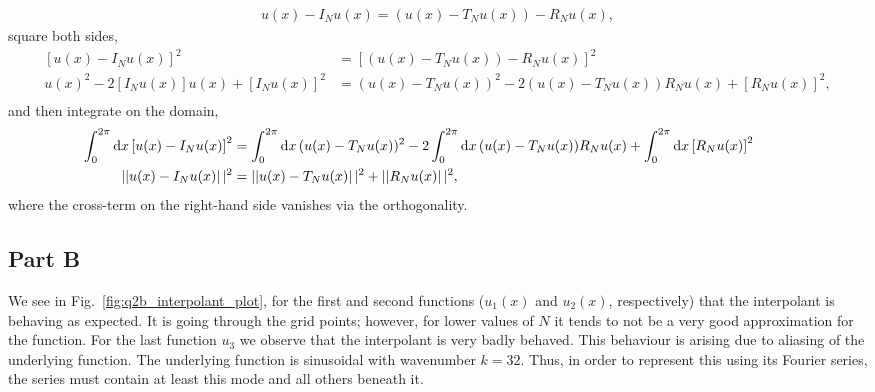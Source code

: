 \documentclass[12pt]{article}
\begin{document}
\begin{align}
	u(x) - I_{N}u(x) = (u(x)-T_{N}u(x)) - R_{N}u(x),
\end{align}
square both sides,
\begin{subequations}
	\begin{align}
		\left[u(x) - I_{N}u(x)\right]^{2} &= \left[(u(x)-T_{N}u(x)) - R_{N}u(x)\right]^{2}\\
		u(x)^{2} - 2\left[I_{N}u(x)\right]u(x) + \left[I_{N}u(x)\right]^{2} &= 
		(u(x)-T_{N}u(x))^{2} - 2(u(x)-T_{N}u(x))R_{N}u(x) + \left[R_{N}u(x)\right]^{2},\\
	\end{align}
\end{subequations}
and then integrate on the domain,
\begin{subequations}
	\begin{align}
		\hspace*{-1.5cm}\int_{0}^{2\pi}\dd{x}\left[u(x) - I_{N}u(x)\right]^{2} &= \int_{0}^{2\pi}\dd{x}(u(x)-T_{N}u(x))^{2} - 2\int_{0}^{2\pi}\dd{x}(u(x)-T_{N}u(x))R_{N}u(x) + \int_{0}^{2\pi}\dd{x}\left[R_{N}u(x)\right]^{2}\\
		\left||u(x) - I_{N}u(x)\right||^{2} &= \left||u(x)-T_{N}u(x)\right||^{2} + \left||R_{N}u(x)\right||^{2},
	\end{align}
\end{subequations}
where the cross-term on the right-hand side vanishes via the orthogonality.


\subsection*{Part B}

We see in Fig.~\ref{fig:q2b_interpolant_plot}, for the first and second functions ($u_{1}(x)$ and $u_{2}(x)$, respectively) that the interpolant is behaving as expected. It is going through the grid points; however, for lower values of $N$ it tends to not be a very good approximation for the function. For the last function $u_{3}$ we observe that the interpolant is very badly behaved. This behaviour is arising due to aliasing of the underlying function. The underlying function is sinusoidal with wavenumber $k=32$. Thus, in order to represent this using its Fourier series, the series must contain at least this mode and all others beneath it.  
\end{document}
